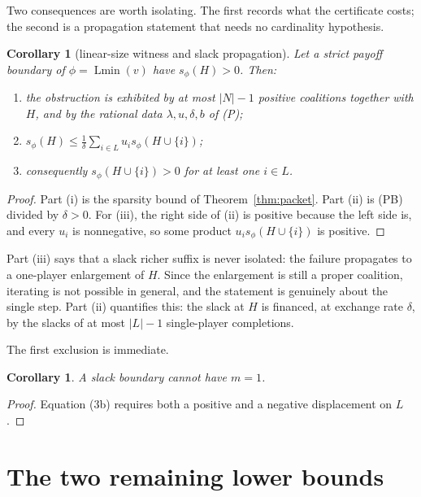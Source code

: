 \documentclass[11pt]{article}
\newtheorem{corollary}[theorem]{Corollary}
\newcommand{\Lmin}{\operatorname{Lmin}}
\begin{document}
Two consequences are worth isolating.  The first records what the certificate
costs; the second is a propagation statement that needs no cardinality
hypothesis.

\begin{corollary}[linear-size witness and slack propagation]
\label{cor:certificate}
Let a strict payoff boundary of $\phi=\Lmin(v)$ have $s_\phi(H)>0$.  Then:
\begin{enumerate}[nosep,label=(\roman*)]
\item the obstruction is exhibited by at most $|N|-1$ positive coalitions
      together with $H$, and by the rational data
      $\lambda,u,\delta,b$ of (P);
\item $\displaystyle
      s_\phi(H)\le\frac1\delta\sum_{i\in L}u_is_\phi(H\cup\{i\})$;
\item consequently $s_\phi(H\cup\{i\})>0$ for at least one $i\in L$.
\end{enumerate}
\end{corollary}

\begin{proof}
Part (i) is the sparsity bound of Theorem~\ref{thm:packet}.  Part (ii) is
(PB) divided by $\delta>0$.  For (iii), the right side of (ii) is positive
because the left side is, and every $u_i$ is nonnegative, so some product
$u_is_\phi(H\cup\{i\})$ is positive.
\end{proof}

Part (iii) says that a slack richer suffix is never isolated: the failure
propagates to a one-player enlargement of $H$.  Since the enlargement is
still a proper coalition, iterating is not possible in general, and the
statement is genuinely about the single step.  Part (ii) quantifies this: the
slack at $H$ is financed, at exchange rate $\delta$, by the slacks of at most
$|L|-1$ single-player completions.

The first exclusion is immediate.

\begin{corollary}\label{cor:m1}
A slack boundary cannot have $m=1$.
\end{corollary}

\begin{proof}
Equation (3b) requires both a positive and a negative displacement on $L$.
\end{proof}

\section{The two remaining lower bounds}
\end{document}
